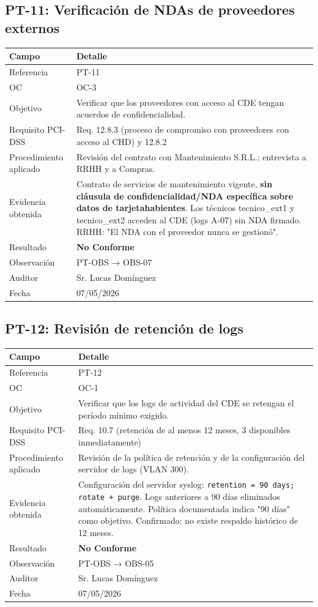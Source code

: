 \documentclass[11pt,a4paper]{article}
\begin{document}
\subsection{PT-11: Verificación de NDAs de proveedores externos}

\begin{tabularx}{\textwidth}{P{5cm}L}
\toprule
\textbf{Campo} & \textbf{Detalle} \\
\midrule
Referencia & PT-11 \\
OC & OC-3 \\
Objetivo & Verificar que los proveedores con acceso al CDE tengan acuerdos de confidencialidad. \\
Requisito PCI-DSS & Req. 12.8.3 (proceso de compromiso con proveedores con acceso al CHD) y 12.8.2 \\
Procedimiento aplicado & Revisión del contrato con Mantenimiento S.R.L.; entrevista a RRHH y a Compras. \\
Evidencia obtenida & Contrato de servicios de mantenimiento vigente, \textbf{sin cláusula de confidencialidad/NDA específica sobre datos de tarjetahabientes}. Los técnicos tecnico_ext1 y tecnico_ext2 acceden al CDE (logs A-07) sin NDA firmado. RRHH: "El NDA con el proveedor nunca se gestionó". \\
Resultado & \textbf{No Conforme} \\
Observación & PT-OBS → OBS-07 \\
Auditor & Sr. Lucas Domínguez \\
Fecha & 07/05/2026 \\
\bottomrule
\end{tabularx}

\subsection{PT-12: Revisión de retención de logs}

\begin{tabularx}{\textwidth}{P{5cm}L}
\toprule
\textbf{Campo} & \textbf{Detalle} \\
\midrule
Referencia & PT-12 \\
OC & OC-1 \\
Objetivo & Verificar que los logs de actividad del CDE se retengan el período mínimo exigido. \\
Requisito PCI-DSS & Req. 10.7 (retención de al menos 12 meses, 3 disponibles inmediatamente) \\
Procedimiento aplicado & Revisión de la política de retención y de la configuración del servidor de logs (VLAN 300). \\
Evidencia obtenida & Configuración del servidor syslog: \texttt{retention = 90 days; rotate + purge}. Logs anteriores a 90 días eliminados automáticamente. Política documentada indica "90 días" como objetivo. Confirmado: no existe respaldo histórico de 12 meses. \\
Resultado & \textbf{No Conforme} \\
Observación & PT-OBS → OBS-05 \\
Auditor & Sr. Lucas Domínguez \\
Fecha & 07/05/2026 \\
\bottomrule
\end{tabularx}
\end{document}
